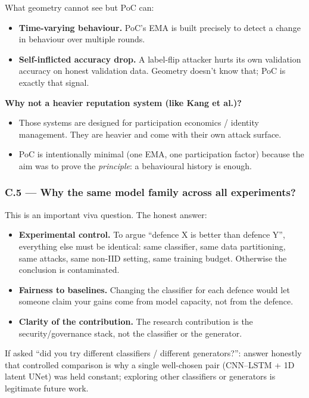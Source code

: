 \documentclass[11pt,a4paper]{article}
\begin{document}
What geometry cannot see but PoC can:
\begin{itemize}
\item \textbf{Time-varying behaviour.} PoC's EMA is built precisely to detect a change in behaviour over multiple rounds.
\item \textbf{Self-inflicted accuracy drop.} A label-flip attacker hurts its own validation accuracy on honest validation data. Geometry doesn't know that; PoC is exactly that signal.
\end{itemize}

\textbf{Why not a heavier reputation system (like Kang et al.)?}
\begin{itemize}
\item Those systems are designed for participation economics / identity management. They are heavier and come with their own attack surface.
\item PoC is intentionally minimal (one EMA, one participation factor) because the aim was to prove the \emph{principle}: a behavioural history is enough.
\end{itemize}

\subsubsection{C.5 --- Why the same model family across all experiments?}

This is an important viva question. The honest answer:
\begin{itemize}
\item \textbf{Experimental control.} To argue ``defence X is better than defence Y'', everything else must be identical: same classifier, same data partitioning, same attacks, same non-IID setting, same training budget. Otherwise the conclusion is contaminated.
\item \textbf{Fairness to baselines.} Changing the classifier for each defence would let someone claim your gains come from model capacity, not from the defence.
\item \textbf{Clarity of the contribution.} The research contribution is the security/governance stack, not the classifier or the generator.
\end{itemize}

If asked ``did you try different classifiers / different generators?'':
answer honestly that controlled comparison is why a single well-chosen
pair (CNN--LSTM + 1D latent UNet) was held constant; exploring other
classifiers or generators is legitimate future work.
\end{document}
